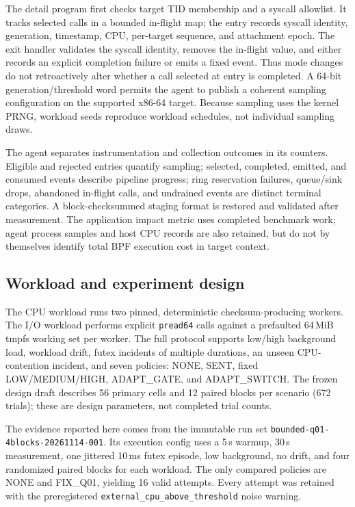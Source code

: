 \documentclass[conference]{IEEEtran}
\begin{document}
The detail program first checks target TID membership and a syscall allowlist. It tracks selected calls in a bounded in-flight map; the entry records syscall identity, generation, timestamp, CPU, per-target sequence, and attachment epoch. The exit handler validates the syscall identity, removes the in-flight value, and either records an explicit completion failure or emits a fixed event. Thus mode changes do not retroactively alter whether a call selected at entry is completed. A 64-bit generation/threshold word permits the agent to publish a coherent sampling configuration on the supported x86-64 target. Because sampling uses the kernel PRNG, workload seeds reproduce workload schedules, not individual sampling draws.

The agent separates instrumentation and collection outcomes in its counters. Eligible and rejected entries quantify sampling; selected, completed, emitted, and consumed events describe pipeline progress; ring reservation failures, queue/sink drops, abandoned in-flight calls, and undrained events are distinct terminal categories. A block-checksummed staging format is restored and validated after measurement. The application impact metric uses completed benchmark work; agent process samples and host CPU records are also retained, but do not by themselves identify total BPF execution cost in target context.

\subsection{Workload and experiment design}
The CPU workload runs two pinned, deterministic checksum-producing workers. The I/O workload performs explicit \texttt{pread64} calls against a prefaulted 64\,MiB tmpfs working set per worker. The full protocol supports low/high background load, workload drift, futex incidents of multiple durations, an unseen CPU-contention incident, and seven policies: NONE, SENT, fixed LOW/MEDIUM/HIGH, ADAPT\_GATE, and ADAPT\_SWITCH. The frozen design draft describes 56 primary cells and 12 paired blocks per scenario (672 trials); these are design parameters, not completed trial counts.

The evidence reported here comes from the immutable run set \texttt{bounded-q01-4blocks-20261114-001}. Its execution config uses a 5\,s warmup, 30\,s measurement, one jittered 10\,ms futex episode, low background, no drift, and four randomized paired blocks for each workload. The only compared policies are NONE and FIX\_Q01, yielding 16 valid attempts. Every attempt was retained with the preregistered \texttt{external\_cpu\_above\_threshold} noise warning.
\end{document}
